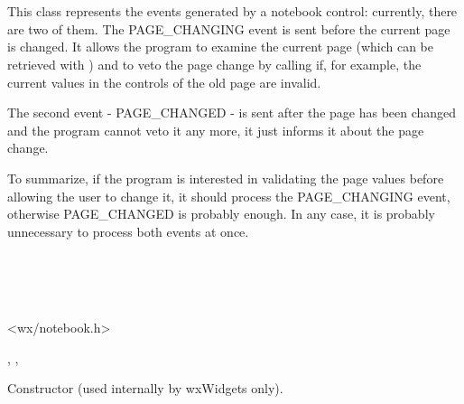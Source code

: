 \section{}\label{wxnotebookevent}

This class represents the events generated by a notebook control: currently,
there are two of them. The PAGE\_CHANGING event is sent before the current
page is changed. It allows the program to examine the current page (which
can be retrieved with 
) and to veto the page
change by calling  if, for example, the
current values in the controls of the old page are invalid.

The second event - PAGE\_CHANGED - is sent after the page has been changed and
the program cannot veto it any more, it just informs it about the page change.

To summarize, if the program is interested in validating the page values
before allowing the user to change it, it should process the PAGE\_CHANGING
event, otherwise PAGE\_CHANGED is probably enough. In any case, it is probably
unnecessary to process both events at once.


\\
\\
\\


<wx/notebook.h>




, , 



\label{wxnotebookeventconstr}


Constructor (used internally by wxWidgets only).


\label{wxnotebookeventgetoldselection}

